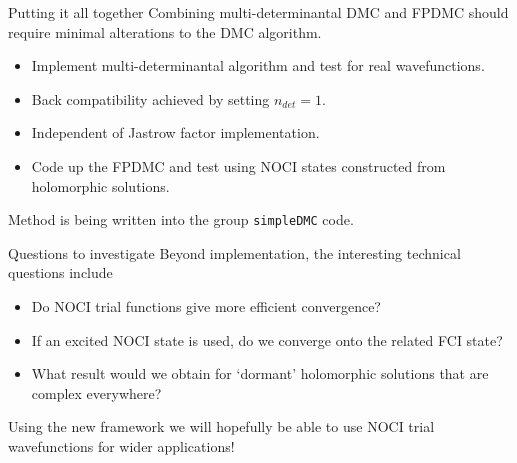 \documentclass{beamer}
\begin{document}
\begin{frame}{Putting it all together}
  Combining multi-determinantal DMC and FPDMC should require minimal alterations to the DMC algorithm.\\
  \begin{itemize}
    \item Implement multi-determinantal algorithm and test for real wavefunctions.
    \item Back compatibility achieved by setting $n_{det} = 1$.
    \item Independent of Jastrow factor implementation.
    \item Code up the FPDMC and test using NOCI states constructed from holomorphic solutions.
  \end{itemize}
  Method is being written into the group \texttt{simpleDMC} code.
\end{frame}

\begin{frame}{Questions to investigate}
  Beyond implementation, the interesting technical questions include
  \begin{itemize}
    \item Do NOCI trial functions give more efficient convergence?
    \item If an excited NOCI state is used, do we converge onto the related FCI state?
    \item What result would we obtain for `dormant' holomorphic solutions that are complex everywhere?
  \end{itemize}
  Using the new framework we will hopefully be able to use NOCI trial wavefunctions for wider applications!
\end{frame}



\end{document}
